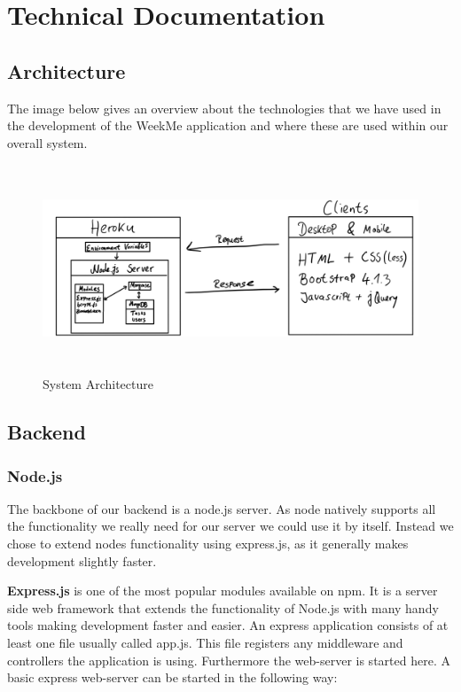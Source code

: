 \section{Technical Documentation}

\subsection{Architecture} 
The image below gives an overview about the technologies that we have used in the development of the WeekMe application and where these are used within our overall system.   

	\begin{figure}[H] 
		\centering 
		\includegraphics[height=6.2cm]{figures/architecture}    
		\caption{System Architecture}     
	\end{figure}  
 
\subsection{Backend} 

\subsubsection{Node.js}
The backbone of our backend is a node.js server. As node natively supports all the functionality we really need for our server we could use it by itself. Instead we chose to extend nodes functionality using express.js, as it generally makes development slightly faster.  




\textbf{Express.js}  is one of the most popular modules available on npm. It is a server side web framework that extends the functionality of Node.js with many handy tools making development faster and easier. An express application consists of at least one file usually called app.js. This file registers any middleware and controllers the application is using. Furthermore the web-server is started here. A basic express web-server can be started in the following way:   

